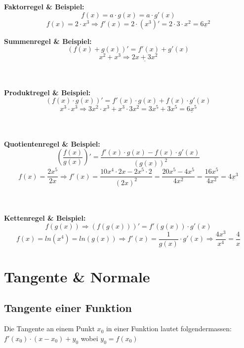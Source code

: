 \documentclass[12pt]{scrartcl}
\begin{document}
\begin{center}
\textbf{Faktorregel \& Beispiel:} 
\[ f(x) = a \cdot g(x) = a \cdot g'(x)\]
\[f(x)=2 \cdot x^3 \Rightarrow f'(x)=2 \cdot (x^3)' = 2 \cdot 3 \cdot x^2 = \underline{6x^2}\]

\newpage
\textbf{Summenregel \& Beispiel:} 
\[ (f(x) + g(x))' = f'(x) + g'(x) \]
\[ x^2 + x^3 \Rightarrow \underline{2x + 3x^2}\]

\hspace{0pt} \\
\hspace{0pt} \\
\noindent
\textbf{Produktregel \& Beispiel:} 
\[ (f(x) \cdot g(x))' =  f'(x) \cdot g(x) + f(x) \cdot g'(x)\]
\[x^3 \cdot x^3 \Rightarrow 3x^2 \cdot x^3 + x^3 \cdot 3x^2 = 3x^5 + 3x^5 = \underline{6x^5}\]


\hspace{0pt} \\
\hspace{0pt} \\
\noindent
\textbf{Quotientenregel \& Beispiel:} 
\[\left(\frac{f(x)}{g(x)}\right)' = \frac{f'(x) \cdot g(x) - f(x) \cdot g'(x)}{(g(x))^2}\]
\[f(x)= \frac{2x^5}{2x} \Rightarrow f'(x) = \frac{10x^4 \cdot 2x - 2x^5 \cdot 2}{(2x)^2} = \frac{20x^5 - 4x^5}{4x^2} = \frac{16x^5}{4x^2} = \underline{4x^3}\]

\hspace{0pt} \\
\hspace{0pt} \\
\noindent
\textbf{Kettenregel \& Beispiel:} 
\[f(g(x)) \Rightarrow (f(g(x)))' = f'(g(x)) \cdot g'(x)\]
\[f(x) = ln(x^4) = ln(g(x)) \Rightarrow f'(x) = \frac{1}{g(x)} \cdot g'(x) \Rightarrow \frac{4x^3}{x^4} = \frac{4}{x}\]


\end{center}

\newpage

\section{Tangente \& Normale}
\subsection{Tangente einer Funktion}
Die Tangente an einem Punkt $x_0$ in einer Funktion lautet folgendermassen:\\
$ f'(x_0) \cdot (x - x_0) + y_0$ wobei $y_0 = f(x_0)$\\
\end{document}
